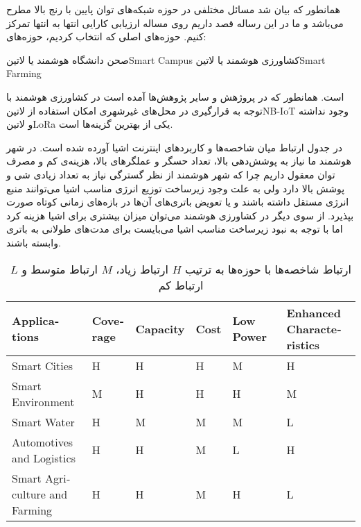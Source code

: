 

همانطور که بیان شد مسائل مختلفی در حوزه شبکه‌های توان پایین با رنج بالا مطرح می‌باشد و ما در این رساله قصد داریم روی مساله ارزیابی کارایی انتها به انتها تمرکز کنیم.
حوزه‌های اصلی که انتخاب کردیم، حوزه‌های:

 صحن دانشگاه هوشمند یا ‌لاتین{Smart Campus}
 کشاورزی هوشمند یا ‌لاتین{Smart Farming}

است. همانطور که در پروژهش  و سایر پژوهش‌ها آمده است در کشاورزی هوشمند با توجه به قرارگیری در محل‌های غیرشهری امکان استفاده
از ‌لاتین{NB-IoT} وجود نداشته و ‌لاتین{LoRa} یکی از بهترین گزینه‌ها است.

در جدول  ارتباط میان شاخصه‌ها و کاربردهای اینترنت اشیا آورده شده است.
در شهر هوشمند ما نیاز به پوشش‌دهی بالا، تعداد حسگر و عملگرهای بالا، هزینه‌ی کم و مصرف توان معقول داریم چرا
که شهر هوشمند از نظر گسترگی نیاز به تعداد زیادی شی و پوشش بالا دارد ولی به علت وجود زیرساخت توزیع انرژی مناسب
اشیا می‌توانند منبع انرژی مستقل داشته باشند و یا تعویض باتری‌های آن‌ها در بازه‌های زمانی کوتاه صورت بپذیرد.
از سوی دیگر در کشاورزی هوشمند می‌توان میزان بیشتری برای اشیا هزینه کرد اما با توجه به نبود زیرساخت مناسب
اشیا می‌بایست برای مدت‌های طولانی به باتری وابسته باشند.

\begin{table}
\label{جدول: شاخصه‌ها و کاربردها}
\caption{ارتباط شاخصه‌ها با حوزه‌ها به ترتیب $H$ ارتباط زیاد، $M$ ارتباط متوسط و $L$ ارتباط کم }
\begin{latin}\begin{tabularx}
  {\textwidth}
  {|*{6}{X|}}
  \toprule
  Applications &
  Coverage &
  Capacity &
  Cost &
  Low Power &
  Enhanced Characteristics \\
  \midrule
  Smart Cities &
  H &
  H &
  H &
  M &
  H \\
  \midrule
  Smart Environment &
  M &
  H &
  H &
  H &
  M \\
  \midrule
  Smart Water &
  H &
  M &
  M &
  M &
  L \\
  \midrule
  Automotives and Logistics &
  H &
  H &
  M &
  L &
  H \\
  \midrule
  Smart Agriculture and Farming &
  H &
  H &
  M &
  H &
  L \\
  \bottomrule
\end{tabularx}\end{latin}
\end{table}

